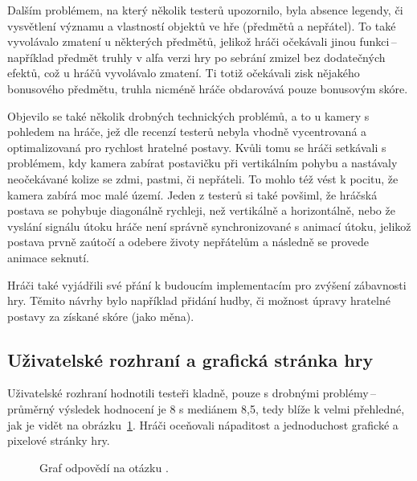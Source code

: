 Dalším problémem, na který několik testerů upozornilo, byla absence legendy, či vysvětlení významu a vlastností objektů ve hře (předmětů a nepřátel). To také vyvolávalo zmatení u některých předmětů, jelikož hráči očekávali jinou funkci\,--\,například předmět truhly v alfa verzi hry po sebrání zmizel bez dodatečných efektů, což u hráčů vyvolávalo zmatení. Ti totiž očekávali zisk nějakého bonusového předmětu, truhla nicméně hráče obdarovává pouze bonusovým skóre.

Objevilo se také několik drobných technických problémů, a to u kamery s pohledem na hráče, jež dle recenzí testerů nebyla vhodně vycentrovaná a optimalizovaná pro rychlost hratelné postavy. Kvůli tomu se hráči setkávali s problémem, kdy kamera  zabírat postavičku při vertikálním pohybu a nastávaly neočekávané kolize se zdmi, pastmi, či nepřáteli. To mohlo též vést k pocitu, že kamera zabírá moc malé území. Jeden z testerů si také povšiml, že hráčská postava se pohybuje diagonálně rychleji, než vertikálně a horizontálně, nebo že vyslání signálu útoku hráče není správně synchronizované s animací útoku, jelikož postava prvně zaútočí a odebere životy nepřátelům a následně se provede animace seknutí.

Hráči také vyjádřili své přání k budoucím implementacím pro zvýšení zábavnosti hry. Těmito návrhy bylo například přidání hudby, či možnost úpravy hratelné postavy za získané skóre (jako měna).

\subsection*{Uživatelské rozhraní a grafická stránka hry}
Uživatelské rozhraní hodnotili testeři kladně, pouze s drobnými problémy\,--\,průměrný výsledek hodnocení je 8 s mediánem 8,5, tedy blíže k velmi přehledné, jak je vidět na obrázku~\ref{fig:hodnoceni_ui}. Hráči oceňovali nápaditost a jednoduchost grafické a pixelové stránky hry. 

\begin{figure}[hb]
\centering
\caption{Graf odpovědí na otázku .}
\label{fig:hodnoceni_ui}
\end{figure}


